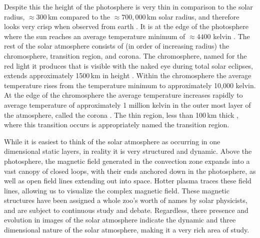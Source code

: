 Despite this  the height of the photosphere is very thin in comparison to the solar radius, $\approx300$\,km compared to the $\approx700,000$\,km solar radius, and therefore looks very crisp when observed from earth \citep{JudgeBook}.
It is at the edge of the photosphere where the sun reaches an average temperature minimum of $\approx4400$ kelvin \citep{SolarPhysicsOverview}.
The rest of the solar atmosphere consists of (in order of increasing radius) the chromosphere, transition region, and corona.
The chromosphere, named for the red light it produces that is visible with the naked eye during total solar eclipses, extends approximately 1500\,km in height \citep{SolarPhysicsOverview}.
Within the chromosphere the average temperature rises from the temperature minimum to approximately 10,000  kelvin.
At the edge of the chromosphere the average temperature increases rapidly to average temperature of approximately 1 million kelvin  in the outer most layer of the atmosphere, called the corona \citep{SolarPhysicsOverview}.
The thin region, less than 100\,km thick \citep{Priest2014}, where this transition occurs is appropriately named the transition region.


While it is easiest to think of the solar atmosphere as occurring in one dimensional static layers, in reality it is very structured and dynamic.
Above the photosphere, the magnetic field generated in the convection zone expands into a vast canopy of closed loops, with their ends anchored down in the photosphere, as well as open field lines extending out into space.
Hotter plasma traces these field lines, allowing us to visualize the complex magnetic field.
These magnetic structures have been assigned a whole zoo's worth of names by solar physicists, and are subject to continuous study and debate.
Regardless, there  presence and evolution in images of the solar atmosphere indicate the dynamic and three dimensional nature of the solar atmosphere, making it a very rich area of study.


